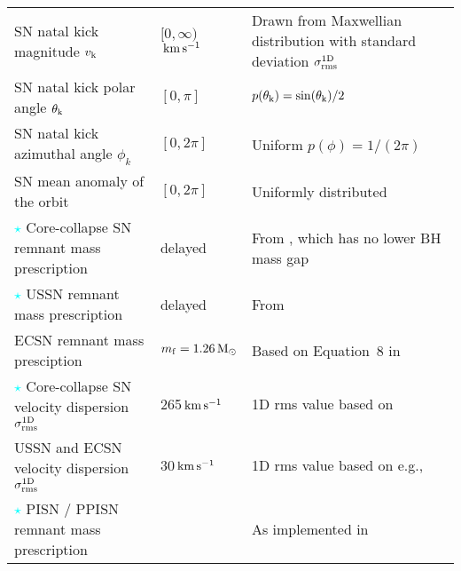 \documentclass[fleqn,usenatbib, onecolumn]{mnras}
\newcommand{\vk}{\ensuremath{v_{\rm{k}}}\xspace}
\newcommand{\thetak}{\ensuremath{{\theta}_{\rm{k}}}\xspace}
\newcommand{\Msun}{\ensuremath{\,\rm{M}_{\odot}}\xspace}
\newcommand{\kms}{\ensuremath{\,\rm{km}\,\rm{s}^{-1}}\xspace}
\begin{document}
\begin{table*}
{\begin{tabular}{lll}
%
{SN} natal kick magnitude \vk                          									& $[0, \infty)$\kms & Drawn from Maxwellian distribution    with standard deviation $\sigma_{\rm{rms}}^{\rm{1D}}$          \\
%
 {SN} natal kick polar angle $\thetak$          											& $[0, \pi]$                        & $p(\thetak) = \sin(\thetak)/2$ \\
%
 {SN} natal kick azimuthal angle $\phi_k$                           					  	& $[0, 2\pi]$                        & Uniform $p(\phi) = 1/ (2 \pi)$   \\
%
 {SN} mean anomaly of the orbit                    											&     $[0, 2\pi]$                             & Uniformly distributed  \\
{\hspace{-.35cm}\Large{\textcolor{cyan}{$\star$}}}{\hspace{+.02cm}} Core-collapse  {SN} remnant mass prescription          									     &  delayed                     &  From \citep{2012ApJ...749...91F}, which  has no lower {BH} mass gap  \\%
%
{\hspace{-.35cm}\Large{\textcolor{cyan}{$\star$}}}{\hspace{+.02cm}} USSN  remnant mass prescription          									     &  delayed                     &  From \citep{2012ApJ...749...91F}   \\%
%
ECSN  remnant mass presciption                        												&                                 $m_{\rm{f}} = 1.26\Msun$ &      Based on Equation~8 in \citet{1996ApJ...457..834T}          \\
%
{\hspace{-.35cm}\Large{\textcolor{cyan}{$\star$}}}{\hspace{+.02cm}} Core-collapse  {SN}  velocity dispersion $\sigma_{\rm{rms}}^{\rm{1D}}$ 			& 265\kms           & 1D rms value based on              \citet{2005MNRAS.360..974H}                          \\
%
 USSN  and ECSN  velocity dispersion $\sigma_{\rm{rms}}^{\rm{1D}}$ 							 	& 30\kms             &            1D rms value based on e.g.,    \citet{2002ApJ...571L..37P,2004ApJ...612.1044P}    \\
%
{\hspace{-.35cm}\Large{\textcolor{cyan}{$\star$}}}{\hspace{+.02cm}} PISN / PPISN remnant mass prescription               											& \citet{2019ApJ...882...36M}                    &       As implemented in \citet{2019ApJ...882..121S}      \\

\end{tabular}}
\end{table*}
\end{document}
